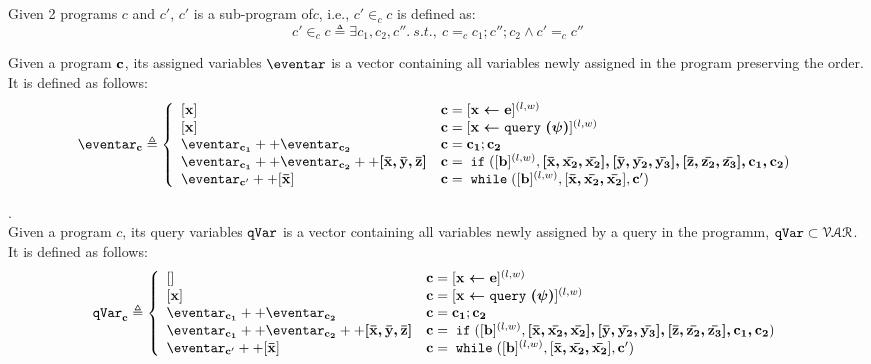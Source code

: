 %
Given 2 programs $c$ and $c'$, $c'$ is a sub-program of$c$, i.e., $c' \in_{c} c$ is defined as:
\begin{equation}
c' \in_{c} c \triangleq \exists c_1, c_2, c''. ~ s.t.,~
c =_{c} c_1; c''; c_2 \land c' =_{c} c''
\end{equation} 
%
\begin{defn}
Given a program ${\boldsymbol{\mathbf{c}}}$, its assigned variables $\eventar$ is a vector containing all variables newly assigned in the program preserving the order. 
It is defined as follows:
$$
  \eventar_{\ssa{c}} \triangleq
  \left\{
  \begin{array}{ll}
      [\ssa{x}]                   
      & \ssa{c} = [\ssa{\assign x e}]^{(l, w)} 
      \\
      \left[ \ssa{x} \right]                  
      & \ssa{c} = [\ssa{\assign x \query(\qexpr)}]^{(l, w)} 
      \\
      \eventar_{\ssa{c_1}} ++ \eventar_{\ssa{c_2}}  
      & \ssa{c} = \ssa{c_1};\ssa{c_2}
      \\
      \eventar_{\ssa{c_1}} ++ \eventar_{\ssa{c_2}} ++ \ssa{[\bar{x}, \bar{y}, \bar{z}]} 
      & \ssa{c} =\eif([\sbexpr]^{(l, w)} , \ssa{[\bar{x}, \bar{x_2}, \bar{x_2}], 
      [\bar{y}, \bar{y_2}, \bar{y_3}], 
      [\bar{z}, \bar{z_2}, \bar{z_3}], c_1, c_2}) 
      \\
      \eventar_{\ssa{c}'} ++ [\ssa{\bar{x}}]
      & \ssa{c}   = \ewhile ([\sbexpr]^{(l, w)}, [\ssa{\bar{x}, \bar{x_2}, \bar{x_2}}], \ssa{c}')
\end{array}
\right.
$$
\end{defn}
%
\begin{defn}.
\\
Given a program $c$, its query variables $\mathtt{qVar}$ is a vector containing all variables newly assigned by a query in the programm, $\mathtt{qVar} \subset \mathcal{VAR}$.
It is defined as follows:
$$
  \qvar_{\ssa{c}} \triangleq
  \left\{
  \begin{array}{ll}
      []                  
      & \ssa{c} = [\ssa{\assign x e}]^{(l, w)} 
      \\
      \left[ \ssa{x} \right]                  
      & \ssa{c} = [\ssa{\assign x \query(\qexpr)}]^{(l, w)} 
      \\
      \eventar_{\ssa{c_1}} ++ \eventar_{\ssa{c_2}}  
      & \ssa{c} = \ssa{c_1};\ssa{c_2}
      \\
      \eventar_{\ssa{c_1}} ++ \eventar_{\ssa{c_2}} ++ \ssa{[\bar{x}, \bar{y}, \bar{z}]} 
      & \ssa{c} =\eif([\sbexpr]^{(l, w)} , \ssa{[\bar{x}, \bar{x_2}, \bar{x_2}], 
      [\bar{y}, \bar{y_2}, \bar{y_3}], 
      [\bar{z}, \bar{z_2}, \bar{z_3}], c_1, c_2}) 
      \\
      \eventar_{\ssa{c}'} ++ [\ssa{\bar{x}}]
      & \ssa{c}   = \ewhile ([\sbexpr]^{(l, w)}, [\ssa{\bar{x}, \bar{x_2}, \bar{x_2}}], \ssa{c}')
\end{array}
\right.
$$
\end{defn}
